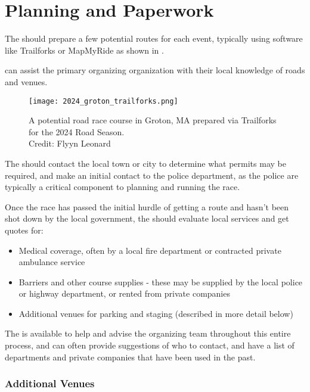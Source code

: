 \section{Planning and Paperwork}

The  should prepare a few potential routes for each event,
typically using software like Trailforks or MapMyRide as shown in .

 can assist the primary organizing organization with their local knowledge of roads and venues.

\begin{figure}[h]
  \texttt{[image: 2024\_groton\_trailforks.png]}
  \caption[Road race course map in Trailforks]{
    A potential road race course in Groton, MA
    prepared via Trailforks for the 2024 Road Season.\\
    Credit: Flyyn Leonard}
\end{figure}


The  should contact the local town or city
to determine what permits may be required, and make an initial contact to the police department,
as the police are typically a critical component to planning and running the race.

Once the race has passed the initial hurdle of getting a route and hasn't been shot down by the local government,
the  should evaluate local services and get quotes for:

\begin{itemize}
  \item Medical coverage, often by a local fire department or contracted private ambulance service
  \item Barriers and other course supplies - these may be supplied by the local police or highway department, or rented from private companies
  \item Additional venues for parking and staging (described in more detail below)
\end{itemize}

The  is available to help and advise the organizing team throughout this entire process,
and can often provide suggestions of who to contact, and have a list of departments and private companies that have been used in the past.

\subsubsection{Additional Venues}

